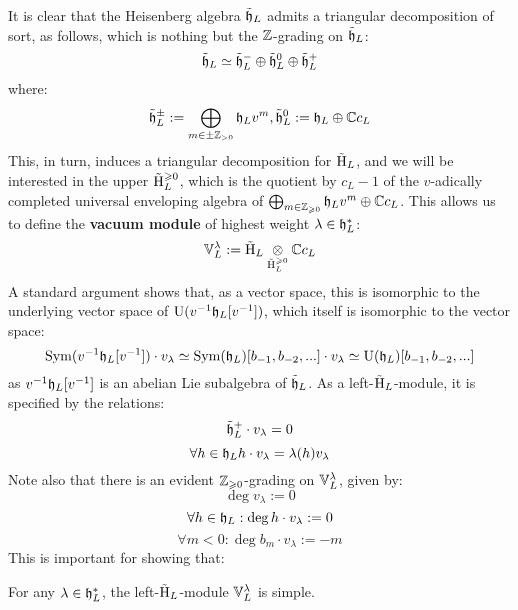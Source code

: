         It is clear that the Heisenberg algebra $\tilde{\mathfrak{h}}_L$ admits a triangular decomposition of sort, as follows, which is nothing but the $\mathbb{Z}$-grading on $\tilde{\mathfrak{h}}_L$:
            $$\tilde{\mathfrak{h}}_L \simeq \tilde{\mathfrak{h}}_L^- \oplus \tilde{\mathfrak{h}}_L^0 \oplus \tilde{\mathfrak{h}}_L^+$$
        where:
            $$\tilde{\mathfrak{h}}_L^{\pm} := \bigoplus_{m \in \pm \mathbb{Z}_{> 0}} \mathfrak{h}_L v^m, \tilde{\mathfrak{h}}_L^0 := \mathfrak{h}_L \oplus \mathbb{C} c_L$$
        This, in turn, induces a triangular decomposition for $\tilde{\mathrm{H}}_L$, and we will be interested in the upper  $\tilde{\mathrm{H}}_L^{\geqslant 0}$, which is the quotient by $c_L - 1$ of the $v$-adically completed universal enveloping algebra of $\bigoplus_{m \in \mathbb{Z}_{\geqslant 0}} \mathfrak{h}_L v^m \oplus \mathbb{C} c_L$. This allows us to define the \textbf{vacuum module} of highest weight $\lambda \in \mathfrak{h}_L^*$:
            $$\V_L^{\lambda} := \tilde{\rmH}_L \tensor_{\tilde{\rmH}_L^{\geq 0}} \bbC c_L$$
        A standard argument shows that, as a vector space, this is isomorphic to the underlying vector space of $\mathrm{U}(v^{-1}\mathfrak{h}_L[v^{-1}])$, which itself is isomorphic to the vector space:
            $$\mathrm{Sym}( v^{-1}\mathfrak{h}_L[v^{-1}] ) \cdot v_{\lambda} \simeq \mathrm{Sym}(\mathfrak{h}_L)[b_{-1}, b_{-2}, ...] \cdot v_{\lambda} \simeq \mathrm{U}(\mathfrak{h}_L)[b_{-1}, b_{-2}, ...]$$
        as $v^{-1}\mathfrak{h}_L[v^{-1}]$ is an abelian Lie subalgebra of $\tilde{\mathfrak{h}}_L$. As a left-$\tilde{\mathrm{H}}_L$-module, it is specified by the relations:
            $$\tilde{\mathfrak{h}}_L^+ \cdot v_{\lambda} = 0$$
            $$\forall h \in \mathfrak{h}_L h \cdot v_{\lambda} = \lambda(h) v_{\lambda}$$
        Note also that there is an evident $\mathbb{Z}_{\geqslant 0}$-grading on $\mathbb{V}_L^{\lambda}$, given by:
            $$\deg v_{\lambda} := 0$$
            $$\forall h \in \mathfrak{h}_L: \deg h \cdot v_{\lambda} := 0$$
            $$\forall m < 0: \deg b_m \cdot v_{\lambda} := -m$$
        This is important for showing that:
        \begin{lemma} \label{lemma: weyl_vacuum_modules_are_simple}
            For any $\lambda \in \mathfrak{h}_L^*$, the left-$\tilde{\mathrm{H}}_L$-module $\mathbb{V}_L^{\lambda}$ is simple.
        \end{lemma}
